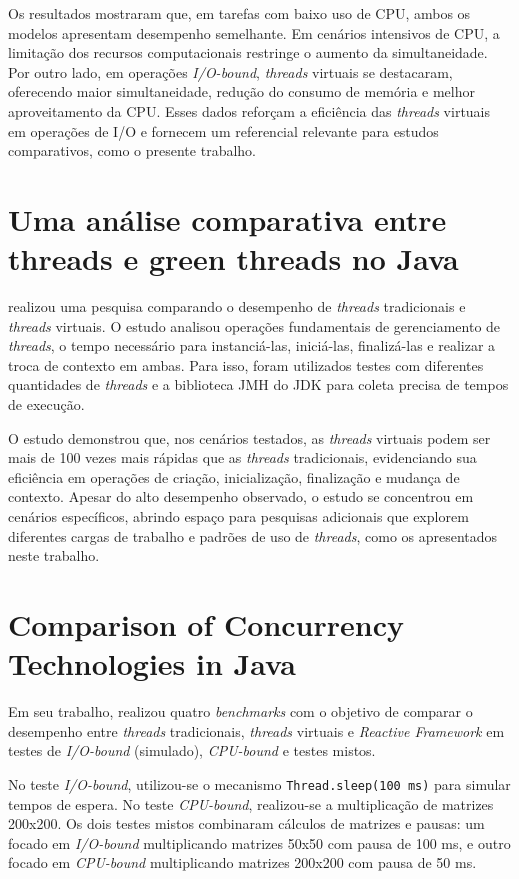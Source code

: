 \documentclass[12pt, openright, oneside, a4paper, english,	french,	spanish, brazil	]{abntex2}
\begin{document}
        Os resultados mostraram que, em tarefas com baixo uso de CPU, ambos os modelos apresentam desempenho semelhante. Em cenários intensivos de CPU, a limitação dos recursos computacionais restringe o aumento da simultaneidade. Por outro lado, em operações \textit{I/O-bound}, \textit{threads} virtuais se destacaram, oferecendo maior simultaneidade, redução do consumo de memória e melhor aproveitamento da CPU. Esses dados reforçam a eficiência das \textit{threads} virtuais em operações de I/O e fornecem um referencial relevante para estudos comparativos, como o presente trabalho.

    \section{Uma análise comparativa entre threads e green threads no Java}
         realizou uma pesquisa comparando o desempenho de \textit{threads} tradicionais e \textit{threads} virtuais. O estudo analisou operações fundamentais de gerenciamento
        de \textit{threads}, o tempo necessário para instanciá-las, iniciá-las, finalizá-las e realizar a troca de contexto em ambas. Para isso, foram utilizados testes com diferentes quantidades de \textit{threads} e a biblioteca JMH do JDK para coleta precisa de tempos de execução.

        O estudo demonstrou que, nos cenários testados, as \textit{threads} virtuais podem ser mais de 100 vezes mais rápidas que as \textit{threads} tradicionais, evidenciando sua eficiência em operações de criação, inicialização, finalização e mudança de contexto.  Apesar do alto desempenho observado, o estudo se concentrou em cenários específicos, abrindo espaço para pesquisas adicionais que explorem diferentes cargas de trabalho e padrões de uso de \textit{threads}, como os apresentados neste trabalho.

    \section{Comparison of Concurrency Technologies in Java}
        Em seu trabalho,  realizou quatro \textit{benchmarks} com o objetivo de comparar o desempenho entre \textit{threads} tradicionais, \textit{threads} virtuais e \textit{Reactive Framework} em testes de \textit{I/O-bound} (simulado), \textit{CPU-bound} e testes mistos.

        No teste \textit{I/O-bound}, utilizou-se o mecanismo \texttt{Thread.sleep(100 ms)} para simular tempos de espera. No teste \textit{CPU-bound}, realizou-se a multiplicação de matrizes 200x200. Os dois testes mistos combinaram cálculos de matrizes e pausas: um focado em \textit{I/O-bound} multiplicando matrizes 50x50 com pausa de 100 ms, e outro focado em \textit{CPU-bound} multiplicando matrizes 200x200 com pausa de 50 ms.
\end{document}

